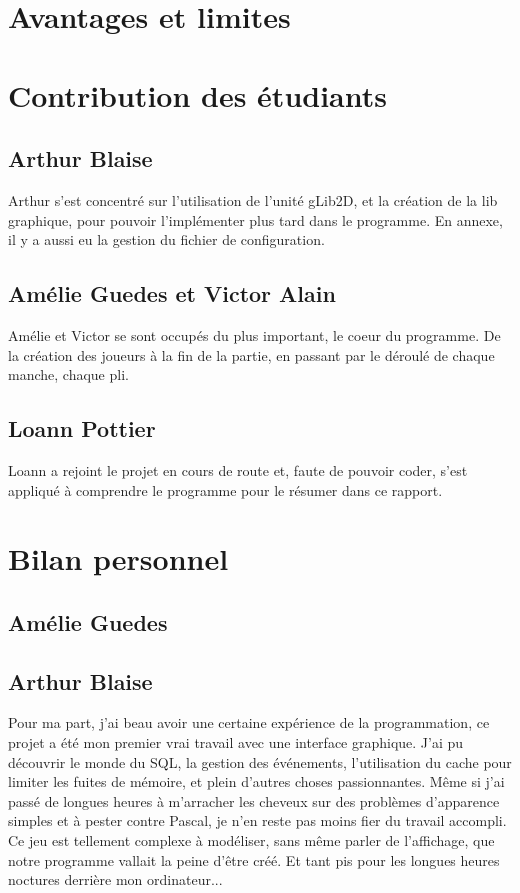 \documentclass[12pt]{report}
\begin{document}
\vspace{15pt}
\section{Avantages et limites}


\section{Contribution des étudiants}
\subsection*{Arthur Blaise}
	Arthur s'est concentré sur l'utilisation de l'unité gLib2D, et la création de la lib graphique, pour pouvoir l'implémenter plus tard dans le programme. En annexe, il y a aussi eu la gestion du fichier de configuration.
	
\subsection*{Amélie Guedes et Victor Alain}
 Amélie et Victor se sont occupés du plus important, le coeur du programme. De la création des joueurs à la fin de la partie, en passant par le déroulé de chaque manche, chaque pli. 
 
\subsection*{Loann Pottier}
Loann a rejoint le projet en cours de route et, faute de pouvoir coder, s'est appliqué à comprendre le programme pour le résumer dans ce rapport.


\vspace{15pt}
\section{Bilan personnel}
\subsection{Amélie Guedes}

\subsection{Arthur Blaise}
Pour ma part, j'ai beau avoir une certaine expérience de la programmation, ce projet a été mon premier vrai travail avec une interface graphique. J'ai pu découvrir le monde du SQL, la gestion des événements, l'utilisation du cache pour limiter les fuites de mémoire, et plein d'autres choses passionnantes. Même si j'ai passé de longues heures à m'arracher les cheveux sur des problèmes d'apparence simples et à pester contre Pascal, je n'en reste pas moins fier du travail accompli. Ce jeu est tellement complexe à modéliser, sans même parler de l'affichage, que notre programme vallait la peine d'être créé. Et tant pis pour les longues heures noctures derrière mon ordinateur...
\end{document}
